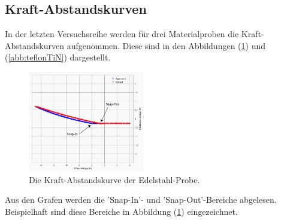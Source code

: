 \subsection{Kraft-Abstandskurven}
In der letzten Versuchsreihe werden f\"ur drei Materialproben die Kraft-Abstandskurven aufgenommen.
Diese sind in den Abbildungen (\ref{abb:edelstahl}) und (\ref{abb:teflonTiN}) dargestellt.
\begin{figure}[hbtp]
	\centering
	\includegraphics[width=0.45\textwidth]{AFM_auswertung/edelstahl_pfeile.png}
	\caption{Die Kraft-Abstandskurve der Edelstahl-Probe.}
\label{abb:edelstahl}
\end{figure}
Aus den Grafen werden die 'Snap-In'- und 'Snap-Out'-Bereiche abgelesen.
Beispielhaft sind diese Bereiche in Abbildung (\ref{abb:edelstahl}) eingezeichnet.
